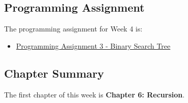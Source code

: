 \subsection{Programming Assignment}

The programming assignment for Week 4 is:

\begin{itemize}
    \item \href{https://github.com/QuantumCompiler/CU/tree/main/CSPB%202270%20-%20Data%20Structures/Assignments/Assignment%203%20-%20Binary%20Search%20Tree}{Programming Assignment 3 - Binary Search Tree}
\end{itemize}

\subsection{Chapter Summary}

The first chapter of this week is \textbf{Chapter 6: Recursion}.

